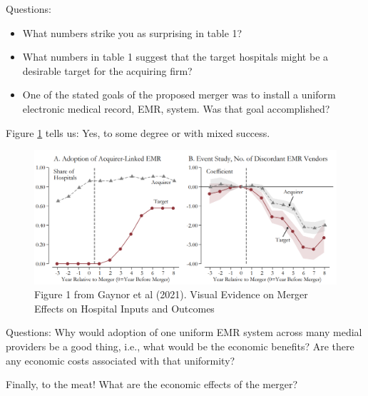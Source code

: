 \documentclass[
]{book}
\providecommand{\tightlist}{%
  \setlength{\itemsep}{0pt}\setlength{\parskip}{0pt}}
\begin{document}
Questions:

\begin{itemize}
\tightlist
\item
  What numbers strike you as surprising in table 1?
\item
  What numbers in table 1 suggest that the target hospitals might be a desirable target for the
  acquiring firm?
\item
  One of the stated goals of the proposed merger was to install a uniform electronic medical record, EMR, system. Was that goal accomplished?
\end{itemize}

Figure \ref{fig:oligopolypapertable2} tells us: Yes, to some degree or with mixed success.

\begin{figure}

{\centering \includegraphics[width=0.7\linewidth]{img/oligopoly/papertable2} 

}

\caption{Figure 1 from Gaynor et al (2021). Visual Evidence on Merger Effects on Hospital Inputs and Outcomes}\label{fig:oligopolypapertable2}
\end{figure}

Questions: Why would adoption of one uniform EMR system across many medial providers be a good thing, i.e., what would be the economic benefits? Are there any economic costs associated with that uniformity?

Finally, to the meat! What are the economic effects of the merger?
\end{document}
